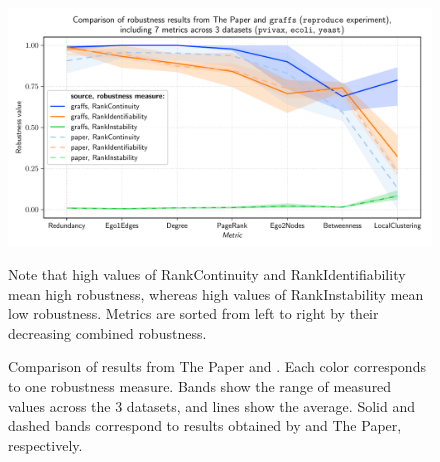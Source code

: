 \begin{figure}
    \includegraphics[width=\linewidth]{plot_reproduction.pdf}
    \vspace*{-0.6cm}
    \caption{Comparison of results from The Paper and \graffs.
    Each color corresponds to one robustness measure.
    Bands show the range of measured values across the 3 datasets, and lines show the average.
    Solid and dashed bands correspond to results obtained by \graffs and The Paper, respectively.}
    \label{fig:plot_reproduction}
    \footnotesize
    \begin{flushleft}
        Note that high values of RankContinuity and RankIdentifiability mean high robustness, whereas high values of RankInstability mean low robustness.
        Metrics are sorted from left to right by their decreasing combined robustness.
    \end{flushleft}
\end{figure}
